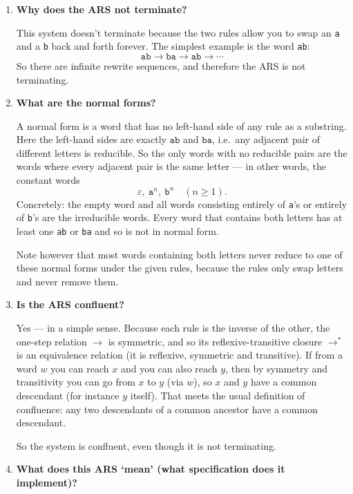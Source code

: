 \documentclass[12pt]{article}
\begin{document}
\begin{enumerate}[label=(\alph*)]
  \item \textbf{Why does the ARS not terminate?}
  
  This system doesn't terminate because the two rules allow you to swap an \texttt{a} and a \texttt{b} back and forth forever. The simplest example is the word \texttt{ab}:
  \[
    \texttt{ab}\longrightarrow\texttt{ba}\longrightarrow\texttt{ab}\longrightarrow\cdots
  \]
  So there are infinite rewrite sequences, and therefore the ARS is not terminating.
  
  \item \textbf{What are the normal forms?}
  
  A normal form is a word that has no left-hand side of any rule as a substring. Here the left-hand sides are exactly \(\texttt{ab}\) and \(\texttt{ba}\), i.e.\ any adjacent pair of different letters is reducible. So the only words with no reducible pairs are the words where every adjacent pair is the same letter — in other words, the constant words
  \[
    \varepsilon,\ \texttt{a}^n,\ \texttt{b}^n \quad (n\ge 1).
  \]
  Concretely: the empty word and all words consisting entirely of \texttt{a}'s or entirely of \texttt{b}'s are the irreducible words. Every word that contains both letters has at least one \texttt{ab} or \texttt{ba} and so is not in normal form.
  
  Note however that most words containing both letters never reduce to one of these normal forms under the given rules, because the rules only swap letters and never remove them.
  
  \item \textbf{Is the ARS confluent?}
  
  Yes — in a simple sense. Because each rule is the inverse of the other, the one-step relation $\to$ is symmetric, and so its reflexive-transitive closure $\to^{*}$ is an equivalence relation (it is reflexive, symmetric and transitive). If from a word \(w\) you can reach \(x\) and you can also reach \(y\), then by symmetry and transitivity you can go from \(x\) to \(y\) (via \(w\)), so \(x\) and \(y\) have a common descendant (for instance \(y\) itself). That meets the usual definition of confluence: any two descendants of a common ancestor have a common descendant.  

  So the system is confluent, even though it is not terminating.
  
  \item \textbf{What does this ARS `mean' (what specification does it implement)?}
  

\end{enumerate}
\end{document}
